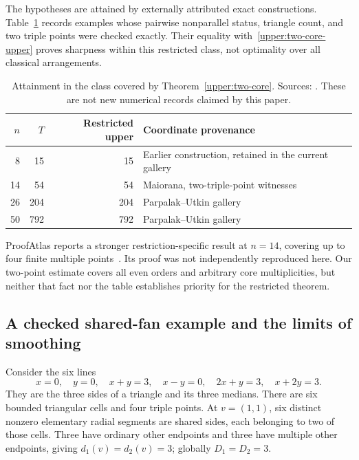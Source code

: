 The hypotheses are attained by externally attributed exact constructions. Table~\ref{upper:restricted-attainment} records examples whose pairwise nonparallel status, triangle count, and two triple points were checked exactly. Their equality with~\eqref{upper:two-core-upper} proves sharpness within this restricted class, not optimality over all classical arrangements.

\begin{table}[htbp]
\centering\small
\begin{tabular}{@{}rrrl@{}}
\toprule
$n$ & $T$ & Restricted upper & Coordinate provenance\\
\midrule
8 & 15 & 15 & Earlier construction, retained in the current gallery\\
14 & 54 & 54 & Maiorana, two-triple-point witnesses\\
26 & 204 & 204 & Parpalak--Utkin gallery\\
50 & 792 & 792 & Parpalak--Utkin gallery\\
\bottomrule
\end{tabular}
\caption{Attainment in the class covered by Theorem~\ref{upper:two-core}. Sources: \citet{maiorana2026,parpalakutkinGallery2026}. These are not new numerical records claimed by this paper.}
\label{upper:restricted-attainment}
\end{table}

ProofAtlas reports a stronger restriction-specific result at $n=14$, covering up to four finite multiple points~\citep{proofatlas2026}. Its proof was not independently reproduced here. Our two-point estimate covers all even orders and arbitrary core multiplicities, but neither that fact nor the table establishes priority for the restricted theorem.

\subsection{A checked shared-fan example and the limits of smoothing}
\label{upper:shared-fan}

Consider the six lines
\begin{equation}
 x=0,\quad y=0,\quad x+y=3,\quad x-y=0,\quad
 2x+y=3,\quad x+2y=3.
 \label{upper:median-lines}
\end{equation}
They are the three sides of a triangle and its three medians. There are six bounded triangular cells and four triple points. At $v=(1,1)$, six distinct nonzero elementary radial segments are shared sides, each belonging to two of those cells. Three have ordinary other endpoints and three have multiple other endpoints, giving $d_1(v)=d_2(v)=3$; globally $D_1=D_2=3$.

